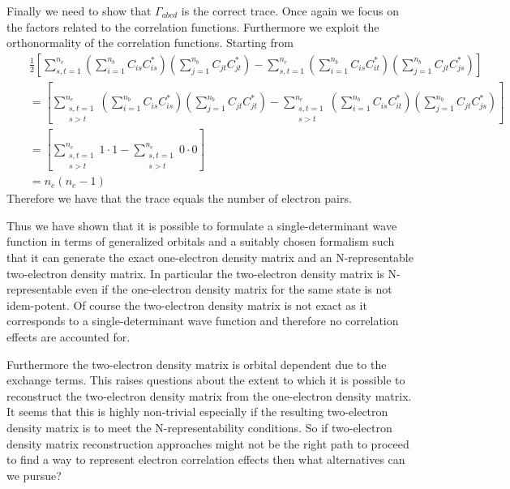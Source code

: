 \documentclass[pra]{revtex4-1}
\begin{document}
Finally we need to show that $\Gamma_{abcd}$ is the correct trace. Once again
we focus on the factors related to the correlation functions. Furthermore
we exploit the orthonormality of the correlation functions. Starting from
\begin{eqnarray}
  &&\frac{1}{2}\left[\sum_{s,t=1}^{n_e}
  \left(\sum_{i=1}^{n_b}C_{is}C^*_{is}\right)
  \left(\sum_{j=1}^{n_b}C_{jt}C^*_{jt}\right)
  -\sum_{s,t=1}^{n_e}
  \left(\sum_{i=1}^{n_b}C_{is}C^*_{it}\right)
  \left(\sum_{j=1}^{n_b}C_{jt}C^*_{js}\right)\right] \nonumber \\
  &&=
  \left[\sum_{\begin{array}{c}s,t=1\\s > t\end{array}}^{n_e}
  \left(\sum_{i=1}^{n_b}C_{is}C^*_{is}\right)
  \left(\sum_{j=1}^{n_b}C_{jt}C^*_{jt}\right)
  -\sum_{\begin{array}{c}s,t=1\\s > t\end{array}}^{n_e}
  \left(\sum_{i=1}^{n_b}C_{is}C^*_{it}\right)
  \left(\sum_{j=1}^{n_b}C_{jt}C^*_{js}\right)\right] \\
  &&= 
  \left[\sum_{\begin{array}{c}s,t=1\\s > t\end{array}}^{n_e}
  1\cdot 1
  -\sum_{\begin{array}{c}s,t=1\\s > t\end{array}}^{n_e}
  0 \cdot 0
  \right] \\
  &&= n_e(n_e-1)
\end{eqnarray}
Therefore we have that the trace equals the number of electron pairs.

Thus we have shown that it is possible to formulate a single-determinant
wave function
in terms of generalized orbitals and a suitably chosen formalism such that it
can generate the exact one-electron density matrix and an N-representable
two-electron density matrix. In particular the two-electron density matrix
is N-representable even if the one-electron density matrix for the same state
is not idem-potent. Of course the two-electron density matrix is not exact as
it corresponds to a single-determinant wave function and therefore no 
correlation effects are accounted for. 

Furthermore the two-electron density matrix is orbital dependent due to the
exchange terms. This raises questions about the extent to which it is possible
to reconstruct the two-electron density matrix from the one-electron density
matrix. It seems that this is highly non-trivial especially if the 
resulting two-electron density matrix is to meet the N-representability 
conditions. So if two-electron density matrix reconstruction approaches might
not be the right path to proceed to find a way to represent electron correlation
effects then what alternatives can we pursue?
\end{document}
